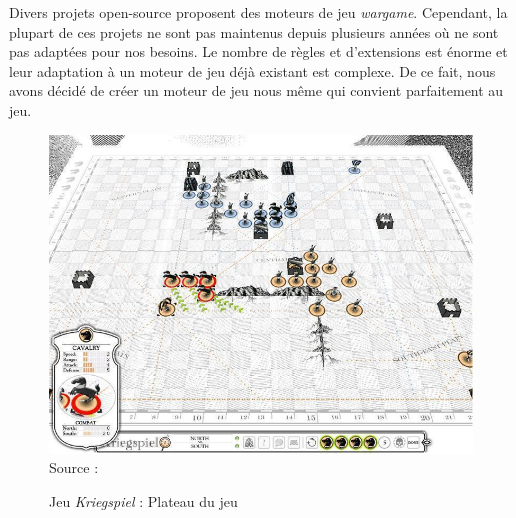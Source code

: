 Divers projets open-source proposent des moteurs de jeu \emph{wargame}. Cependant, la plupart de ces projets ne sont pas maintenus depuis plusieurs années où ne sont pas adaptées pour nos besoins.
Le nombre de règles et d'extensions est énorme et leur adaptation à un moteur de jeu déjà existant est complexe.
De ce fait, nous avons décidé de créer un moteur de jeu nous même qui convient parfaitement au jeu.
\begin{figure}[H]
    \centering
    \includegraphics[scale=0.5]{data/kriegspiel.jpeg}\\
    Source : 
    \caption{Jeu \textit{Kriegspiel} : Plateau du jeu}
\end{figure}


